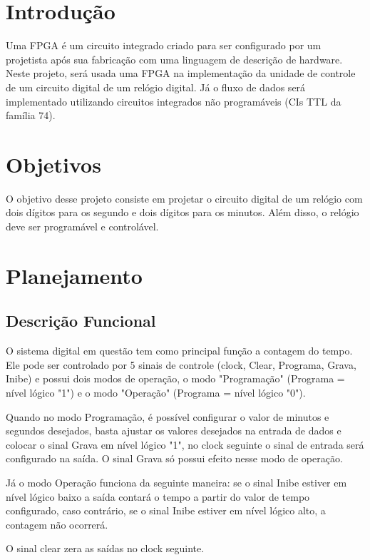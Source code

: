 \documentclass[a4,12pt]{horizon-theme}
\begin{document}
\horizonCover

\horizonTitle


\section{Introdução}
Uma FPGA é um circuito integrado criado para ser configurado por um projetista após sua fabricação com uma linguagem de descrição de hardware. Neste projeto, será usada uma FPGA na implementação da unidade de controle de um circuito digital de um relógio digital. Já o fluxo de dados será implementado utilizando circuitos integrados não programáveis (CIs TTL da família 74).

\section{Objetivos}
    O objetivo desse projeto consiste em projetar o circuito digital de um relógio com dois dígitos para os segundo e dois dígitos para os minutos. Além disso, o relógio deve ser programável e controlável.
    
\section{Planejamento}
\subsection{Descrição Funcional}
    O sistema digital em questão tem como principal função a contagem do tempo. Ele pode ser controlado por 5 sinais de controle (clock, Clear, Programa, Grava, Inibe) e possui dois modos de operação, o modo "Programação" (Programa = nível lógico "1") e o modo "Operação" (Programa = nível lógico "0"). 
    
    Quando no modo Programação, é possível configurar o valor de minutos e segundos desejados, basta ajustar os valores desejados na entrada de dados e colocar o sinal Grava em nível lógico "1", no clock seguinte o sinal de entrada será configurado na saída. O sinal Grava só possui efeito nesse modo de operação.
    
    Já o modo Operação funciona da seguinte maneira: se o sinal Inibe estiver em nível lógico baixo a saída contará o tempo a partir do valor de tempo configurado, caso contrário, se o sinal Inibe estiver em nível lógico alto, a contagem não ocorrerá. 
    
    O sinal clear zera as saídas no clock seguinte.
\end{document}
